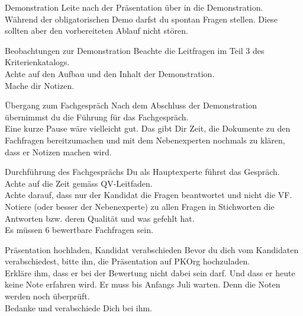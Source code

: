 \newpage
\begin{taskitem}{Demonstration}
  Leite nach der Präsentation über in die Demonstration.\\
  Während der obligatorischen Demo darfst du spontan Fragen stellen. Diese sollten aber den vorbereiteten Ablauf nicht stören.
\end{taskitem}
\begin{taskitem}{Beobachtungen zur Demonstration}
  Beachte die Leitfragen im Teil 3 des Kriterienkatalogs.\\
  Achte auf den Aufbau und den Inhalt der Demonstration.\\
  Mache dir Notizen.
\end{taskitem}
\begin{taskitemwithoutcomment}{Übergang zum Fachgespräch}
  Nach dem Abschluss der Demonstration übernimmst du die Führung für das Fachgespräch.\\Eine kurze Pause wäre vielleicht gut. Das gibt Dir Zeit, die Dokumente zu den Fachfragen bereitzumachen und mit dem Nebenexperten nochmals zu klären, dass er Notizen machen wird.
\end{taskitemwithoutcomment}
\begin{taskitemwithoutcomment}{Durchführung des Fachgesprächs}
  Du als Hauptexperte führst das Gespräch. Achte auf die Zeit gemäss QV-Leitfaden.\\Achte darauf, dass nur der Kandidat die Fragen beantwortet und nicht die VF.\\Notiere (oder besser der Nebenexperte) zu allen Fragen in Stichworten die Antworten bzw. deren Qualität und was gefehlt hat.\\Es müssen 6 bewertbare Fachfragen sein.
\end{taskitemwithoutcomment}
\begin{taskitemwithoutcomment}{Präsentation hochladen, Kandidat verabschieden}
  Bevor du dich vom Kandidaten verabschiedest, bitte ihn, die Präsentation auf PKOrg hochzuladen.\\Erkläre ihm, dass er bei der Bewertung nicht dabei sein darf. Und dass er heute keine Note erfahren wird. Er muss bis Anfangs Juli warten. Denn die Noten werden noch überprüft.\\Bedanke und verabschiede Dich bei ihm.
\end{taskitemwithoutcomment}
